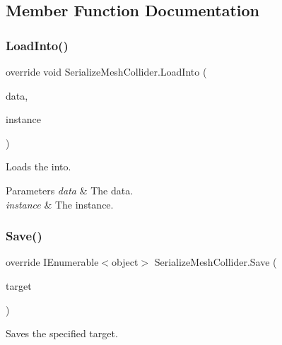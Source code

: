 \subsection{Member Function Documentation}
\mbox{\label{class_serialize_mesh_collider_a1eccb54d758de6fa752f5b0b564fb5bd}} 
\subsubsection{\texorpdfstring{Load\+Into()}{LoadInto()}}
{\footnotesize\ttfamily override void Serialize\+Mesh\+Collider.\+Load\+Into (\begin{DoxyParamCaption}\item[{object \mbox{[}$\,$\mbox{]}}]{data,  }\item[{Mesh\+Collider}]{instance }\end{DoxyParamCaption})\hspace{0.3cm}{\ttfamily [inline]}}



Loads the into. 


\begin{DoxyParams}{Parameters}
{\em data} & The data.\\
\hline
{\em instance} & The instance.\\
\hline
\end{DoxyParams}
\mbox{\label{class_serialize_mesh_collider_acbc1ced332f6d66efa97213718c8e90a}} 
\subsubsection{\texorpdfstring{Save()}{Save()}}
{\footnotesize\ttfamily override I\+Enumerable$<$object$>$ Serialize\+Mesh\+Collider.\+Save (\begin{DoxyParamCaption}\item[{Mesh\+Collider}]{target }\end{DoxyParamCaption})\hspace{0.3cm}{\ttfamily [inline]}}



Saves the specified target. 


